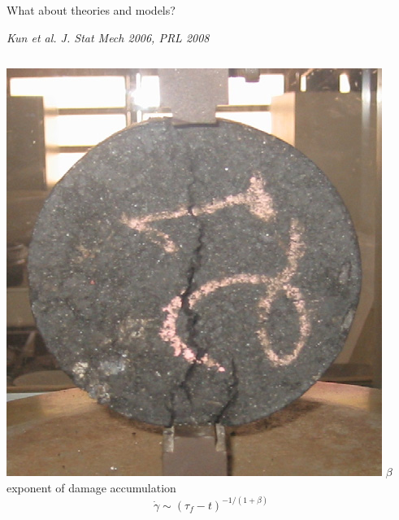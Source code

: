 \begin{frame}{What about theories and models?}
\begin{block}{\textit{\footnotesize Kun et al. J. Stat Mech 2006, PRL 2008}}
\begin{columns}
\includegraphics[height=5\baselineskip]{asphalt}
$\beta$ exponent of damage accumulation
\[\dot{\gamma}\sim \left(\tau_f-t\right)^{-1/(1+\beta)}\]
\end{columns}
\end{block}


\end{frame}

